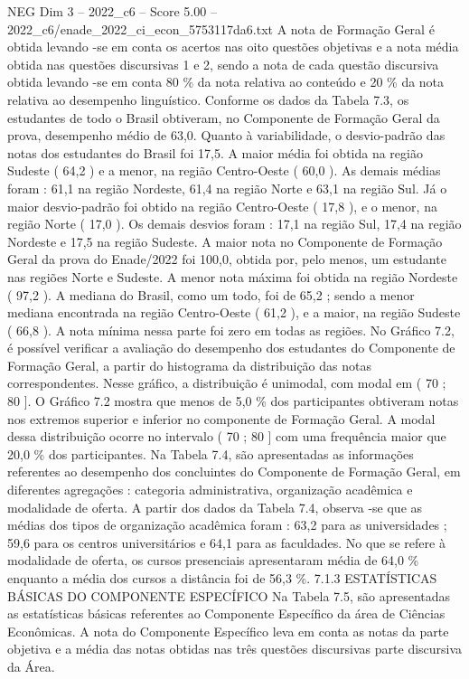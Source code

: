 \begin{textsample}{NEG Dim 3 – 2022\_c6 – Score 5.00 – 2022\_c6/enade\_2022\_ci\_econ\_5753117da6.txt}
A nota de Formação Geral é obtida levando -se em conta os acertos nas oito questões objetivas e a nota média obtida nas questões discursivas 1 e 2, sendo a nota de cada questão discursiva obtida levando -se em conta 80 \% da nota relativa ao conteúdo e 20 \% da nota relativa ao desempenho linguístico.
Conforme os dados da Tabela 7.3, os estudantes de todo o Brasil obtiveram, no Componente de Formação Geral da prova, desempenho médio de 63,0.
Quanto à variabilidade, o desvio-padrão das notas dos estudantes do Brasil foi 17,5.
A maior média foi obtida na região Sudeste ( 64,2 ) e a menor, na região Centro-Oeste ( 60,0 ).
As demais médias foram : 61,1 na região Nordeste, 61,4 na região Norte e 63,1 na região Sul.
Já o maior desvio-padrão foi obtido na região Centro-Oeste ( 17,8 ), e o menor, na região Norte ( 17,0 ).
Os demais desvios foram : 17,1 na região Sul, 17,4 na região Nordeste e 17,5 na região Sudeste.
A maior nota no Componente de Formação Geral da prova do Enade/2022 foi 100,0, obtida por, pelo menos, um estudante nas regiões Norte e Sudeste.
A menor nota máxima foi obtida na região Nordeste ( 97,2 ).
A mediana do Brasil, como um todo, foi de 65,2 ; sendo a menor mediana encontrada na região Centro-Oeste ( 61,2 ), e a maior, na região Sudeste ( 66,8 ).
A nota mínima nessa parte foi zero em todas as regiões.
No Gráfico 7.2, é possível verificar a avaliação do desempenho dos estudantes do Componente de Formação Geral, a partir do histograma da distribuição das notas correspondentes.
Nesse gráfico, a distribuição é unimodal, com modal em ( 70 ; 80 ].
O Gráfico 7.2 mostra que menos de 5,0 \% dos participantes obtiveram notas nos extremos superior e inferior no componente de Formação Geral.
A modal dessa distribuição ocorre no intervalo ( 70 ; 80 ] com uma frequência maior que 20,0 \% dos participantes.
Na Tabela 7.4, são apresentadas as informações referentes ao desempenho dos concluintes do Componente de Formação Geral, em diferentes agregações : categoria administrativa, organização acadêmica e modalidade de oferta.
A partir dos dados da Tabela 7.4, observa -se que as médias dos tipos de organização acadêmica foram : 63,2 para as universidades ; 59,6 para os centros universitários e 64,1 para as faculdades.
No que se refere à modalidade de oferta, os cursos presenciais apresentaram média de 64,0 \% enquanto a média dos cursos a distância foi de 56,3 \%. 7.1.3 ESTATÍSTICAS BÁSICAS DO COMPONENTE ESPECÍFICO Na Tabela 7.5, são apresentadas as estatísticas básicas referentes ao Componente Específico da área de Ciências Econômicas.
A nota do Componente Específico leva em conta as notas da parte objetiva e a média das notas obtidas nas três questões discursivas parte discursiva da Área.

\end{textsample}
